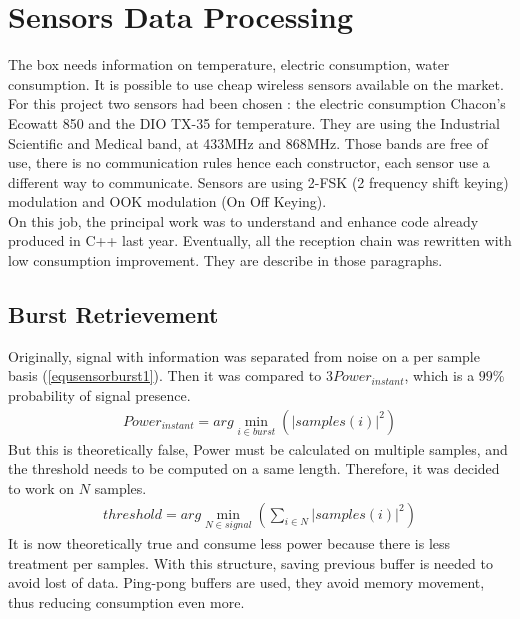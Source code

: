 %
%
\section{Sensors Data Processing}
The box needs information on temperature, electric consumption, water consumption. It is possible to use cheap wireless sensors available on the market. For this project two sensors had been chosen : the electric consumption Chacon's Ecowatt 850 and the DIO TX-35 for temperature. They are using the Industrial Scientific and Medical band, at 433MHz and 868MHz. Those bands are free of use, there is no communication rules hence each constructor, each sensor use a different way to communicate. Sensors are using 2-FSK (2 frequency shift keying) modulation and OOK modulation (On Off Keying). \\
On this job, the principal work was to understand and enhance code already produced in \textsc{C++} last year. Eventually, all the reception chain was rewritten with low consumption improvement. They are describe in those paragraphs.

\subsection{Burst Retrievement}
Originally, signal with information was separated from noise on a per sample basis (\ref{equsensorburst1}). Then it was compared to $3Power_{instant}$, which is a $99\%$ probability of signal presence.
\vspace{-7pt}
\begin{align} \label{equsensorburst1}
Power_{instant} = arg\min_{i\in burst}(|samples(i)|^2)
\end{align}
But this is theoretically false, Power must be calculated on multiple samples, and the threshold needs to be computed on a same length. Therefore, it was decided to work on $N$ samples.
\begin{align} \label{equsensorburst2}
threshold = arg\min_{N \in signal}\left(\sum_{i\in N}|samples(i)|^2\right)
\end{align}
It is now theoretically true and consume less power because there is less treatment per samples. With this structure, saving previous buffer is needed to avoid lost of data. Ping-pong buffers are used, they avoid memory movement, thus reducing consumption even more.\\

